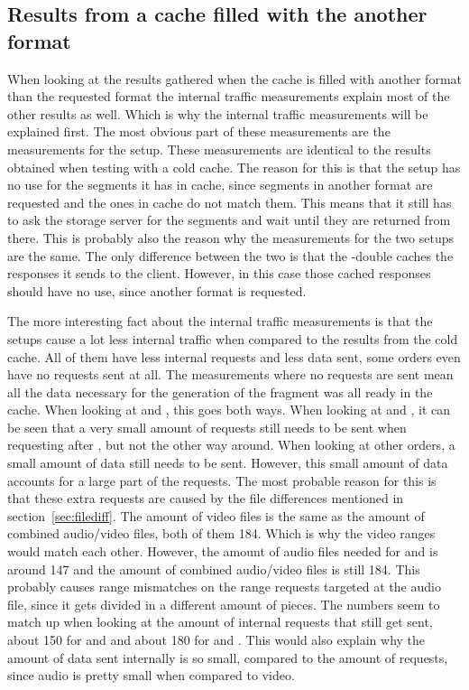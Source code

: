 \documentclass[twoside,openright]{uva-bachelor-thesis}
\begin{document}
\subsection{Results from a cache filled with the another format}
When looking at the results gathered when the cache is filled with another
format than the requested format the internal traffic measurements explain most
of the other results as well. Which is why the internal traffic measurements
will be explained first. The most obvious part of these measurements are
the measurements for the \cdn setup. These measurements are identical to the
results obtained when testing with a cold cache. The reason for this is that the
\cdn setup has no use for the segments it has in cache, since segments in
another format are requested and the ones in cache do not match them. This means
that it still has to ask the storage server for the segments and wait until they
are returned from there. This is probably also the reason why the measurements
for the two \lt setups are the same. The only difference between the two is
that the \lt-double caches the responses it sends to the client. However, in
this case those cached responses should have no use, since another format is
requested.

The more interesting fact about the internal traffic measurements is that the
\lt setups cause a lot less internal traffic when compared to the results from
the cold cache. All of them have less internal requests and less data sent, some
orders even have no requests sent at all. The measurements where no requests are
sent mean all the data necessary for the generation of the fragment was all
ready in the cache. When looking at \dash and \iss, this goes both ways. When
looking at \hds and \hls, it can be seen that a very small amount of requests
still needs to be sent when requesting \hls after \hds, but not the other way
around. When looking at other orders, a small amount of data still needs to be
sent.  However, this small amount of data accounts for a large part of the
requests.  The most probable reason for this is that these extra requests are
caused by the file differences mentioned in section~\ref{sec:filediff}. The
amount of video files is the same as the amount of combined audio/video files,
both of them 184. Which is why the video ranges would match each other.
However, the amount of audio files needed for \dash and \iss is around 147 and
the amount of combined audio/video files is still 184. This probably causes
range mismatches on the range requests targeted at the audio file, since it gets
divided in a different amount of pieces. The numbers seem to match up when
looking at the amount of internal requests that still get sent, about 150 for
\dash and \iss and about 180 for \hds and \hls. This would also explain why the
amount of data sent internally is so small, compared to the amount of requests,
since audio is pretty small when compared to video.
\end{document}
